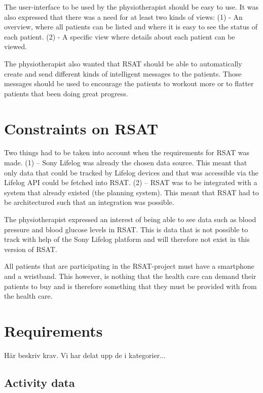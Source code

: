 \documentclass{cslthse-msc}
\begin{document}
The user-interface to be used by the physiotherapist should be easy to use. It was also expressed that there was a need for at least two kinds of views: (1) - An overview, where all patients can be listed and where it is easy to see the status of each patient. (2) - A specific view where details about each patient can be viewed.

The physiotherapist also wanted that RSAT should be able to automatically create and send different kinds of intelligent messages to the patients. Those messages should be used to encourage the patients to workout more or to flatter patients that been doing great progress. 


\section{Constraints on RSAT}

Two things had to be taken into account when the requirements for RSAT was made. (1) – Sony Lifelog was already the chosen data source. This meant that only data that could be tracked by Lifelog devices and that was accessible via the Lifelog API could be fetched into RSAT.  (2) – RSAT was to be integrated with a system that already existed (the planning system).  This meant that RSAT had to be architectured such that an integration was possible.

The physiotherapist expressed an interest of being able to see data such as blood pressure and blood glucose levels in RSAT. This is data that is not possible to track with help of the Sony Lifelog platform and will therefore not exist in this version of RSAT.

All patients that are participating in the RSAT-project must have a smartphone and a wristband. This however, is nothing that the health care can demand their patients to buy and is therefore something that they must be provided with from the health care.


\section{Requirements}
\label{sec:req}

Här beskriv krav. Vi har delat upp de i kategorier...

\subsection{Activity data}

\end{document}
